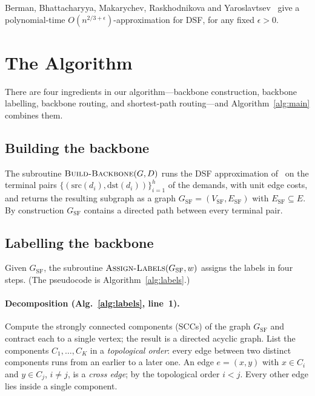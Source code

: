\documentclass[11pt]{article}
\theoremstyle{definition}
\theoremstyle{remark}
\newcommand{\ESF}{E_{\mathrm{SF}}}
\newcommand{\GSF}{G_{\mathrm{SF}}}
\newcommand{\VSF}{V_{\mathrm{SF}}}
\newcommand{\src}{\mathrm{src}}
\newcommand{\dst}{\mathrm{dst}}
\begin{document}
\noindent Berman, Bhattacharyya, Makarychev, Raskhodnikova and Yaroslavtsev~\cite{BBMRY13} give a
polynomial-time $O(n^{2/3+\epsilon})$-approximation for DSF, for any fixed $\epsilon>0$.

\section{The Algorithm}\label{sec:algorithm}

There are four ingredients in our algorithm---backbone construction, backbone labelling, backbone
routing, and shortest-path routing---and Algorithm~\ref{alg:main} combines them.

\subsection{Building the backbone}\label{sec:build}

The subroutine $\textsc{Build-Backbone}(G,D)$ runs the DSF approximation of~\cite{BBMRY13} on the
terminal pairs $\{(\src(d_i),\dst(d_i))\}_{i=1}^{h}$ of the demands, with unit edge costs, and returns
the resulting subgraph as a graph $\GSF=(\VSF,\ESF)$ with $\ESF\subseteq E$. By construction $\GSF$
contains a directed path between every terminal pair.

\subsection{Labelling the backbone}\label{sec:label}

Given $\GSF$, the subroutine $\textsc{Assign-Labels}(\GSF,w)$ assigns the labels in four steps. (The
pseudocode is Algorithm~\ref{alg:labels}.)

\paragraph{Decomposition (Alg.~\ref{alg:labels}, line~1).} Compute the strongly connected components
(SCCs) of the graph $\GSF$ and contract each to a single vertex; the result is a directed acyclic
graph. List the components $C_1,\dots,C_K$ in a \emph{topological order}: every edge between two
distinct components runs from an earlier to a later one. An edge $e=(x,y)$ with $x\in C_i$ and
$y\in C_j$, $i\neq j$, is a \emph{cross edge}; by the topological order $i<j$. Every other edge lies
inside a single component.
\end{document}
